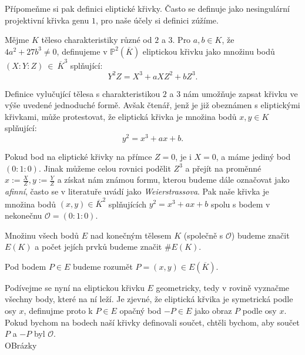 \documentclass [12pt]{report}
\begin{document}
Přípomeňme si pak definici eliptické křivky. Často se definuje jako nesingulární projektivní křivka genu $1$, pro naše účely si definici zúžíme.
\begin{definice}
Mějme $K$ těleso charakteristiky různé od $2$ a $3$. Pro $a,b \in K$, že\\ $4a^2+27b^3 \neq 0$, definujeme v $\mathbb{P}^2 (\overline{K})$ eliptickou křivku jako množinu bodů $(X:Y:Z)~\in~\overline{K}^3$ splňující:
\begin{equation*}
Y^2 Z = X^3 + a X Z^2 + b Z^3. 
\end{equation*}
\end{definice}

Definice vylučující tělesa s charakteristikou $2$ a $3$ nám umožňuje zapsat křivku ve výše uvedené jednoduché formě. Avšak čtenář, jenž je již obeznámen s eliptickými křivkami, může protestovat, že eliptická křivka je množina bodů $x,y \in K$ splňující:
\begin{equation*}
y^2 = x^3 + a x + b.
\end{equation*}

Pokud bod na eliptické křivky na přímce $Z=0$, je i $X = 0$, a máme jediný bod $(0:1:0)$. Jinak můžeme celou rovnici podělit $Z^3$ a přejít na proměnné $x := \frac{X}{Z}, y := \frac{Y}{Z}$ a získat nám známou formu, kterou budeme dále označovat jako \textit{afinní}, často se v literatuře uvádí jako \textit{Weierstrassova}. Pak naše křivka je množina bodů $(x,y) \in \overline{K}^2$ splňujících $y^2 = x^3 + a x + b$ spolu s bodem v nekonečnu $\mathcal{O} = (0:1:0)$.
\begin{definice}
 Množinu všech bodů $E$ nad konečným tělesem $K$ (společně s $\mathcal{O}$) budeme značit $E(K)$ a počet jejích prvků budeme značit $\# E(K)$.
\end{definice}

\begin{definice}
Pod bodem $P \in E$ budeme rozumět $P = (x,y) \in E(\overline{K})$.
\end{definice}

Podívejme se nyní na eliptickou křivku $E$ geometricky, tedy v rovině vyznačme všechny body, které na ní leží. Je zjevné, že eliptická křvika je symetrická podle osy $x$, definujme proto k $P \in E$ opačný bod $-P \in E$ jako obraz $P$ podle osy $x$. Pokud bychom na bodech naší křivky definovali součet, chtěli bychom, aby součet $P$ a $-P$ byl $\mathcal{O}$.\\

OBrázky\\
\end{document}
